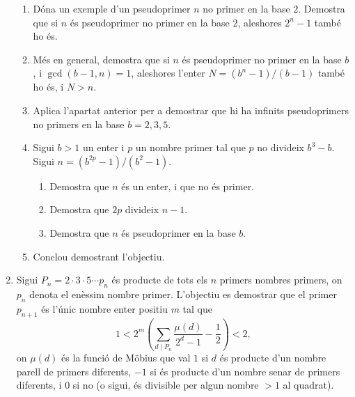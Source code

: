 \begin{enumerate}[leftmargin=*]
\begin{enumerate}
\item Dóna un exemple d'un pseudoprimer $n$ no primer en la base $2$. Demostra que
si $n$ és pseudoprimer no primer en la base $2$, aleshores $2^n-1$
també ho és.
\item Més en general, demostra que si  $n$ és pseudoprimer no primer en la base
$b$, i $\gcd(b-1,n)=1$, aleshores l'enter $N=(b^n-1)/(b-1)$ també ho
és, i $N>n$.
\item Aplica l'apartat anterior per a demostrar que hi ha infinits
pseudoprimers no primers en la base $b=2,3,5$.
\item Sigui $b>1$ un enter i $p$ un nombre primer tal que $p$ no
divideix $b^3-b$. Sigui $n=(b^{2p}-1)/(b^2-1)$.
\begin{enumerate}
\item Demostra que $n$ és un enter, i que no és primer.
\item Demostra que $2p$ divideix $n-1$.
\item Demostra que $n$ és pseudoprimer en la base $b$.
\end{enumerate}
\item Conclou demostrant l'objectiu.
\end{enumerate}


\item Sigui $P_n=2\cdot 3 \cdot 5 \cdots p_n$ és producte de
tots els $n$ primers nombres primers, on $p_n$ denota el en\`{e}ssim
nombre primer. L'objectiu es demostrar que el primer $p_{n+1}$ és
l'únic nombre enter positiu $m$ tal que
$$1<2^m\left(\sum_{d\mid P_n} \frac{\mu(d)}{2^d-1} - \frac 12
\right)<2,$$ on $\mu(d)$ és la funció de M\"{o}bius que val $1$ si $d$
és producte d'un nombre parell de primers diferents, $-1$ si és
producte d'un nombre senar de primers diferents, i $0$ si no (o
sigui, és divisible per algun nombre $>1$ al quadrat).


\end{enumerate}
